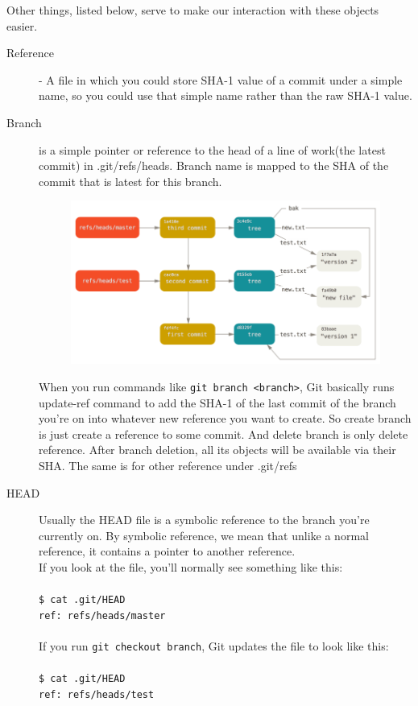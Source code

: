 \documentclass[12pt,oneside]{article}
\newcommand{\code}[1]{\texttt{#1}}
\begin{document}
{\large Other things, listed below, serve to make our interaction with these objects easier.
}
\begin{description}
  \item[Reference] - A file in which you could store SHA-1 value
  of a commit under a simple name, so you could use that simple name
  rather than the raw SHA-1 value.
  \item[Branch] is a simple pointer or reference to the head of a line of work(the latest commit) in .git/refs/heads.
  Branch name is mapped to the SHA of the commit that is latest for this branch.
  \begin{figure}[H]
    \centering
    \includegraphics[width=\textwidth]{data-model-4.png}
    \label{fig:reference}
  \end{figure}
  When you run commands like \code{git branch <branch>},
  Git basically runs update-ref command to add the SHA-1
  of the last commit of the branch you're on into whatever
  new reference you want to create.
  So create branch is just create a reference to some commit.
  And delete branch is only delete reference.
  After branch deletion, all its objects will be available via their SHA.
  The same is for other reference under .git/refs
  \item[HEAD] Usually the HEAD file is a symbolic reference to the branch
  you're currently on.
  By symbolic reference, we mean that unlike a normal reference,
  it contains a pointer to another reference.\\
  If you look at the file, you'll normally see something like this:\\
  \\
  \code{\$ cat .git/HEAD}\\
  \code{ref: refs/heads/master}\\
  \\If you run \code{git checkout branch}, Git updates the file to look like this:\\
  \\
  \code{\$ cat .git/HEAD}\\
  \code{ref: refs/heads/test}\\


\end{description}
\end{document}
